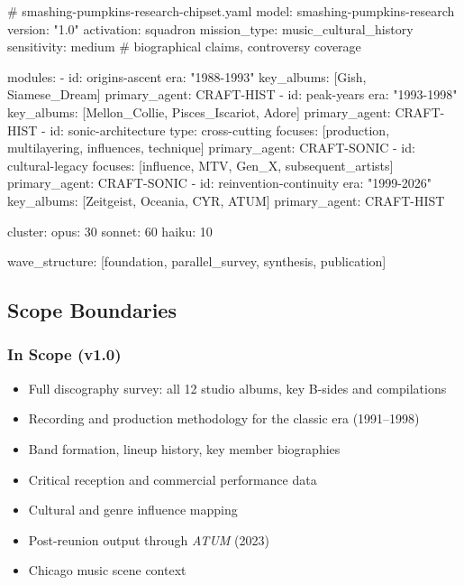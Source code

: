 \documentclass[11pt,letterpaper]{article}
\begin{document}
\begin{asciibox}
# smashing-pumpkins-research-chipset.yaml
model: smashing-pumpkins-research
version: "1.0"
activation: squadron
mission_type: music_cultural_history
sensitivity: medium  # biographical claims, controversy coverage

modules:
  - id: origins-ascent
    era: "1988-1993"
    key_albums: [Gish, Siamese_Dream]
    primary_agent: CRAFT-HIST
  - id: peak-years
    era: "1993-1998"
    key_albums: [Mellon_Collie, Pisces_Iscariot, Adore]
    primary_agent: CRAFT-HIST
  - id: sonic-architecture
    type: cross-cutting
    focuses: [production, multilayering, influences, technique]
    primary_agent: CRAFT-SONIC
  - id: cultural-legacy
    focuses: [influence, MTV, Gen_X, subsequent_artists]
    primary_agent: CRAFT-SONIC
  - id: reinvention-continuity
    era: "1999-2026"
    key_albums: [Zeitgeist, Oceania, CYR, ATUM]
    primary_agent: CRAFT-HIST

cluster:
  opus: 30%
  sonnet: 60%
  haiku: 10%

wave_structure: [foundation, parallel_survey, synthesis, publication]
\end{asciibox}

\subsection{Scope Boundaries}

\subsubsection{In Scope (v1.0)}

\begin{itemize}
  \item Full discography survey: all 12 studio albums, key B-sides and compilations
  \item Recording and production methodology for the classic era (1991--1998)
  \item Band formation, lineup history, key member biographies
  \item Critical reception and commercial performance data
  \item Cultural and genre influence mapping
  \item Post-reunion output through \textit{ATUM} (2023)
  \item Chicago music scene context
\end{itemize}
\end{document}
